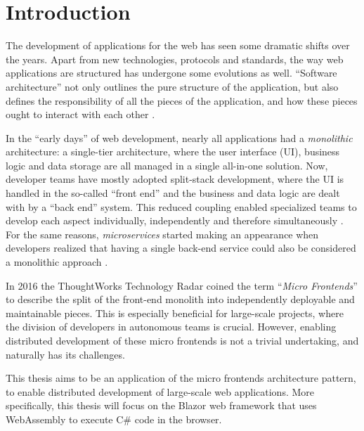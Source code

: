 
\section{Introduction}
\label{sec:introduction}

The development of applications for the web has seen some dramatic shifts over
the years. Apart from new technologies, protocols and standards, the way web
applications are structured has undergone some evolutions as well. ``Software
architecture'' not only outlines the pure structure of the application, but also
defines the responsibility of all the pieces of the application, and how these
pieces ought to interact with each other \autocite{Fedorov_etal_1998}.

In the ``early days'' of web development, nearly all applications had a
\textit{monolithic} architecture: a single-tier architecture, where the user
interface (UI), business logic and data storage are all managed in a single
all-in-one solution. Now, developer teams have mostly adopted split-stack
development, where the UI is handled in the so-called ``front end'' and the
business and data logic are dealt with by a ``back end'' system. This reduced
coupling enabled specialized teams to develop each aspect individually,
independently and therefore simultaneously \autocite{Dunkley_2016}. For the same
reasons, \textit{microservices} started making an appearance when developers
realized that having a single back-end service could also be considered a
monolithic approach \autocite{Fowler_Microservices_2014}.

In 2016 the ThoughtWorks Technology Radar \autocite{ThoughtWorks_2020} coined
the term ``\textit{Micro Frontends}'' to describe the split of the front-end
monolith into independently deployable and maintainable pieces. This is
especially beneficial for large-scale projects, where the division of developers
in autonomous teams is crucial. However, enabling distributed development of
these micro frontends is not a trivial undertaking, and naturally has its
challenges.

This thesis aims to be an application of the micro frontends architecture
pattern, to enable distributed development of large-scale web applications. More
specifically, this thesis will focus on the
Blazor web framework that uses
WebAssembly to execute
C\# code in the browser.   

